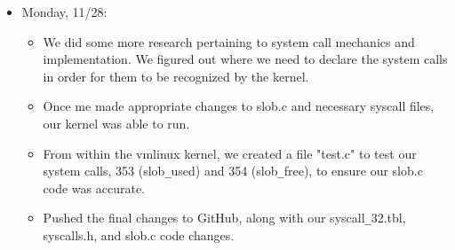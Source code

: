 \documentclass[letterpaper,10pt,onecolumn]{IEEEtran}
\begin{document}
\begin{itemize}
        \item Monday, 11/28:
            \begin{itemize} 
                \item We did some more research pertaining to system call mechanics and implementation. We figured out where we need to declare the system calls in order for them to be recognized by the kernel.
                \item Once me made appropriate changes to slob.c and necessary syscall files, our kernel was able to run.
                \item From within the vmlinux kernel, we created a file "test.c" to test our system calls, 353 (slob\texttt{\_}used) and 354 (slob\texttt{\_}free), to ensure our slob.c code was accurate.
        	    \item Pushed the final changes to GitHub, along with our syscall\texttt{\_}32.tbl, syscalls.h, and slob.c code changes.
        	\end{itemize}
    \end{itemize}
    
    
    \vspace{6mm}
    
   
\end{document}

